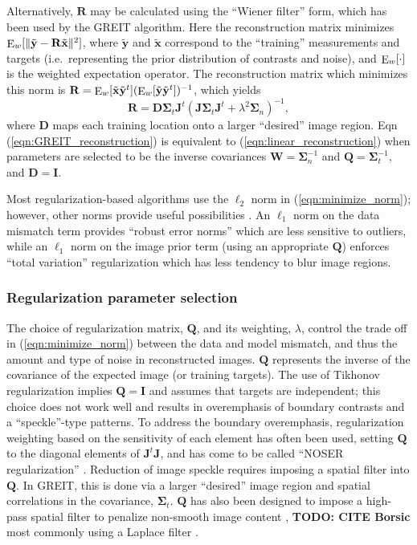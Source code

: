 \documentclass[12pt]{article} \usepackage[margin=3cm]{geometry} \usepackage[margin=20pt,font=small,labelfont=bf]{caption}\def\TBLWIDA{35mm}\def\TBLWIDB{95mm}
\newcommand{\TODO}[1]{{\bf TODO: #1}}
\newcommand{\xT}{\tilde{\mathbf{x}}}
\newcommand{\yT}{\tilde{\mathbf{y}}}
\newcommand{\DB}{\mathbf{D}}
\newcommand{\IB}{\mathbf{I}}
\newcommand{\RB}{\mathbf{R}}
\newcommand{\QB}{\mathbf{Q}}
\newcommand{\WB}{\mathbf{W}}
\newcommand{\JB}{\mathbf{J}}
\newcommand{\SG}{\bm{\Sigma}}
\newcommand{\Ew}{\mathop{\rm E}_w}
\begin{document}
Alternatively, $\RB$ may be calculated using the ``Wiener filter'' form,
which has been used by the GREIT \cite{Adler2009GREIT} algorithm. Here the
reconstruction matrix minimizes 
$\Ew[\|\yT - \RB \xT\|^2]$, where 
$\yT$ and $\xT$ correspond to the ``training'' measurements and targets
(i.e.\ representing the prior distribution of contrasts and noise), and
$\Ew[\cdot]$ is the weighted expectation operator. The reconstruction
matrix which minimizes this norm is
$\RB = \Ew[ \xT \yT^t] (\Ew[ \yT \yT^t ])^{-1}$,
which yields \cite{Grychtol20163DEIT}
\begin{equation}
\RB= \DB \SG_t \JB^t \left( \JB \SG_t \JB^t + \lambda^2 \SG_n \right)^{-1},
\label{eqn:GREIT_reconstruction}
\end{equation}
where $\DB$ maps each training location onto
a larger ``desired'' image region.
Eqn (\ref{eqn:GREIT_reconstruction}) is equivalent to 
    (\ref{eqn:linear_reconstruction}) when parameters are
selected to be the inverse covariances
$\WB = \SG_n^{-1}$ and 
$\QB = \SG_t^{-1}$, and $\DB= \IB$.

Most regularization-based algorithms use the $\ell_2$ norm in
(\ref{eqn:minimize_norm}); however, other norms
provide useful possibilities \cite{Borsic2012PDIPM}.
An $\ell_1$ norm on the 
data mismatch term provides ``robust error norms'' which
are less sensitive to outliers, while 
an $\ell_1$ norm on the image prior term (using an appropriate $\QB$)
enforces ``total variation'' regularization which has
less tendency to blur image regions.

\subsubsection{Regularization parameter selection}

The choice of regularization matrix, $\QB$, and its weighting, $\lambda$,
control the trade off in (\ref{eqn:minimize_norm}) between the
data and model mismatch, and thus the amount and type of noise
in reconstructed images. $\QB$ represents the inverse of the
covariance of the expected image (or training targets). The use
of Tikhonov regularization implies $\QB=\IB$ and assumes that
targets are independent; this choice does not work well and
results in overemphasis of boundary contrasts and a ``speckle''-type
patterns. To address the boundary overemphasis,
 regularization weighting based on the sensitivity of each element has often
been used, setting $\QB$ to the diagonal elements of $\JB^t \JB$, and has come
to be called ``NOSER regularization'' \cite{Cheney1990NOSER}.
Reduction of image speckle requires imposing a spatial filter
into $\QB$. In GREIT, this is done via a larger ``desired'' image
region and spatial correlations in the covariance, $\SG_t$. 
$\QB$ has also been designed to impose a 
high-pass spatial filter
to penalize non-smooth image content \cite{Adler1996Constrast},
\TODO{CITE Borsic}
most commonly using a Laplace filter \cite{Polydorides2002EIDORS}.
\end{document}
